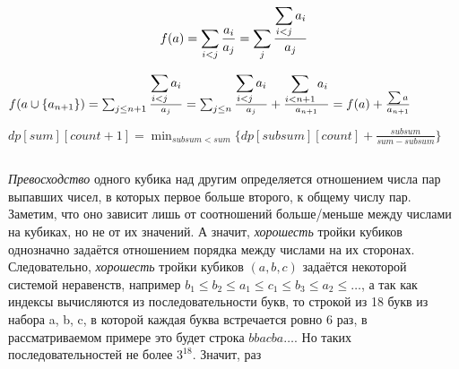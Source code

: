 \documentclass{article}
\begin{document}
\begin{center}
\addtocounter{subsection}{1} %

\subsection{} %

\[f(a) = \sum_{i<j} \frac{a_i}{a_j} = \sum_j \frac{\small{\displaystyle \sum_{i<j} a_i }}{a_j}\]

$f(a \cup \{a_{n+1}\}) = \sum_{j\leq n + 1} \frac{\small{\displaystyle \sum_{i<j} a_i }}{a_j} = \sum_{j\leq n} \frac{\small{\displaystyle \sum_{i<j} a_i }}{a_j} + \frac{\small{\displaystyle \sum_{i<n+1} a_i }}{a_{n+1}} = f(a) + \frac{\sum a}{a_{n+1}}$

$dp[sum][count + 1] = \min_{subsum < sum}{\{dp[subsum][count] + \frac{subsum}{sum - subsum}\}}$

\subsection{} %

\subsection{} %


\subsection{} %

\textit{Превосходство} одного кубика над другим определяется отношением числа пар выпавших чисел, в которых первое больше второго, к общему числу пар. Заметим, что оно зависит лишь от соотношений больше/меньше между числами на кубиках, но не от их значений. А значит, \textit{хорошесть} тройки кубиков однозначно задаётся отношением порядка между числами на их сторонах. Следовательно, \textit{хорошесть} тройки кубиков $(a, b, c)$ задаётся некоторой системой неравенств, например $b_1 \leq b_2 \leq a_1 \leq c_1 \leq b_3 \leq a_2 \leq \hdots$, а так как индексы вычисляются из последовательности букв, то строкой из 18 букв из набора a, b, c, в которой каждая буква встречается ровно 6 раз, в рассматриваемом примере это будет строка $bbacba\hdots$. Но таких последовательностей не более $3^18$. Значит, раз 


\end{center}
\end{document}
